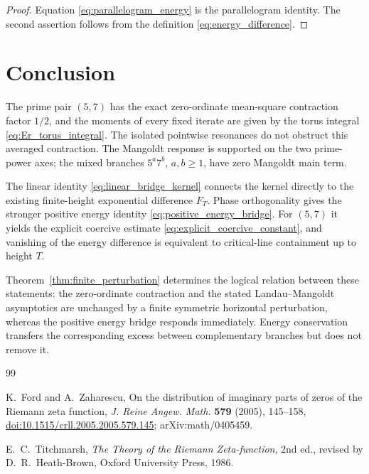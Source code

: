 \documentclass[11pt]{amsart}
\numberwithin{equation}{section}
\theoremstyle{plain}
\theoremstyle{definition}
\theoremstyle{remark}
\begin{document}
\begin{proof}
Equation \eqref{eq:parallelogram_energy} is the parallelogram identity.  The second assertion follows from the definition \eqref{eq:energy_difference}.
\end{proof}

\section{Conclusion}
\label{sec:conclusion}

The prime pair $(5,7)$ has the exact zero-ordinate mean-square contraction factor $1/2$, and the moments of every fixed iterate are given by the torus integral \eqref{eq:Er_torus_integral}.  The isolated pointwise resonances do not obstruct this averaged contraction.  The Mangoldt response is supported on the two prime-power axes; the mixed branches $5^a7^b$, $a,b\geq1$, have zero Mangoldt main term.

The linear identity \eqref{eq:linear_bridge_kernel} connects the kernel directly to the existing finite-height exponential difference $F_T$.  Phase orthogonality gives the stronger positive energy identity \eqref{eq:positive_energy_bridge}.  For $(5,7)$ it yields the explicit coercive estimate \eqref{eq:explicit_coercive_constant}, and vanishing of the energy difference is equivalent to critical-line containment up to height $T$.

Theorem~\ref{thm:finite_perturbation} determines the logical relation between these statements: the zero-ordinate contraction and the stated Landau--Mangoldt asymptotics are unchanged by a finite symmetric horizontal perturbation, whereas the positive energy bridge responds immediately.  Energy conservation transfers the corresponding excess between complementary branches but does not remove it.

\begin{thebibliography}{99}

K.~Ford and A.~Zaharescu,
On the distribution of imaginary parts of zeros of the Riemann zeta function,
\emph{J. Reine Angew. Math.} \textbf{579} (2005), 145--158,
\href{https://doi.org/10.1515/crll.2005.2005.579.145}{doi:10.1515/crll.2005.2005.579.145}; arXiv:math/0405459.

E.~C.~Titchmarsh,
\emph{The Theory of the Riemann Zeta-function},
2nd ed., revised by D.~R.~Heath-Brown,
Oxford University Press, 1986.

\end{thebibliography}
\end{document}
